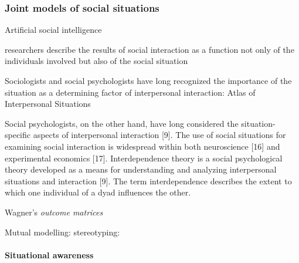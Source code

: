 \subsubsection{Joint models of social situations}



Artificial social intelligence~\cite{bainbridge1994artificial}

researchers describe the results of social
interaction as a function not only of the individuals involved
but also of the social situation~\cite{rusbult2003interdependence}

Sociologists and social psychologists have long
recognized the importance of the situation as a determining
factor of interpersonal interaction: Atlas of Interpersonal Situations~\cite{kelley2003atlas}

Social psychologists, on the other hand, have long
considered the situation-specific aspects of interpersonal
interaction [9]. The use of social situations for examining
social interaction is widespread within both neuroscience [16]
and experimental economics [17]. Interdependence theory is a
social psychological theory developed as a means for
understanding and analyzing interpersonal situations and
interaction [9]. The term interdependence describes the extent
to which one individual of a dyad influences the other.

Wagner's \emph{outcome matrices}
\cite{wagner2006framework} \cite{wagner2009creating}

Mutual modelling:
\cite{dillenbourg2016symmetry}
stereotyping: \cite{wagner2015robots}


\paragraph{Situational awareness}

